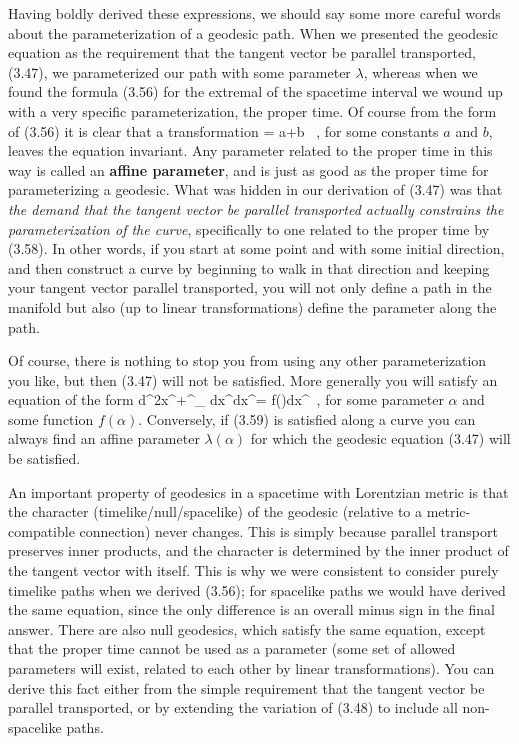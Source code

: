\documentclass[12pt]{article}
\begin{document}
Having boldly derived these expressions, we should say some more 
careful words about the parameterization of a geodesic path.
When we presented the geodesic equation as the requirement that
the tangent vector be parallel transported, (3.47), we parameterized
our path with some parameter $\lambda$, whereas when we found 
the formula (3.56) for the extremal of the spacetime interval we wound
up with a very specific parameterization, the proper time.  Of course
from the form of (3.56) it is clear that a transformation 
\be
  \tau \rightarrow \lambda = a\tau +b \ ,\label{3.58}
\ee
for some constants $a$ and $b$, leaves the equation invariant.  Any
parameter related to the proper time in this way is called an
{\bf affine parameter}, and is just as good as the proper time
for parameterizing a geodesic.  What was hidden in our derivation
of (3.47) was that {\it the demand that the tangent vector be parallel
transported actually constrains the parameterization of the curve},
specifically to one related to the proper time by (3.58).  In other
words, if you start at some point and with some initial direction,
and then construct a curve by beginning to walk in that direction
and keeping your tangent vector parallel transported, you will not
only define a path in the manifold but also (up to linear transformations)
define the parameter along the path.

Of course, there is nothing to stop you from using any other 
parameterization you like, but then (3.47) will not be satisfied.
More generally you will satisfy an equation of the form
\be
  {{d^2x^\mu}}+\Gamma^\mu_{\rho\sigma}
  {{dx^\rho}}{{dx^\sigma}}=
  f(\alpha){{dx^\mu}}\ ,\label{3.59}
\ee
for some parameter $\alpha$ and some function $f(\alpha)$.
Conversely, if (3.59) is satisfied along a curve you can always find
an affine parameter $\lambda(\alpha)$ for which the geodesic equation
(3.47) will be satisfied.

An important property of geodesics in a spacetime with Lorentzian
metric is that the character (timelike/null/spacelike) of the
geodesic (relative to a metric-compatible connection) never changes.  
This is simply because parallel transport preserves inner products,
and the character is determined by the inner product of the tangent
vector with itself.  This is why we were consistent to consider
purely timelike paths when we derived (3.56); for spacelike paths
we would have derived the same equation, since the only difference
is an overall minus sign in the final answer.  There are also null
geodesics, which satisfy the same equation, except that the proper
time cannot be used as a parameter (some set of allowed parameters
will exist, related to each other by linear transformations).  You
can derive this fact either from the simple requirement that the
tangent vector be parallel transported, or by extending the variation
of (3.48) to include all non-spacelike paths.
\end{document}
